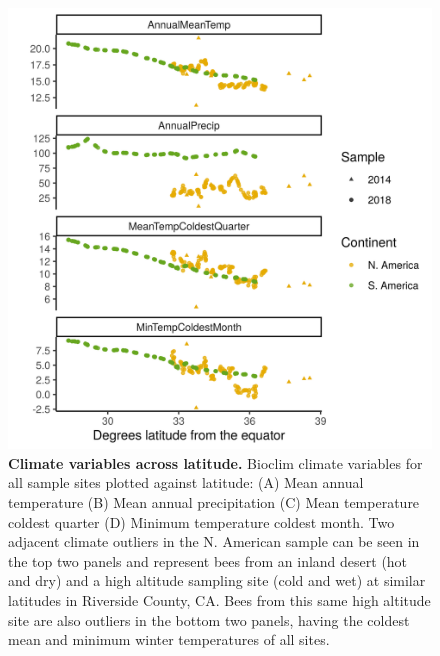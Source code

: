 \begin{figure}[ht]
\includegraphics[width=.9\textwidth]{chapter1/figures/climate_variables_across_latitude.png}
\caption{ \textbf{Climate variables across latitude.} Bioclim climate variables for all sample sites plotted against latitude: (A) Mean annual temperature (B) Mean annual precipitation (C) Mean temperature coldest quarter (D) Minimum temperature coldest month. Two adjacent climate outliers in the N. American sample can be seen in the top two panels and represent bees from an inland desert (hot and dry) and a high altitude sampling site (cold and wet) at similar latitudes in Riverside County, CA. Bees from this same high altitude site are also outliers in the bottom two panels, having the coldest mean and minimum winter temperatures of all sites.}

\label{supp_bioclim}
\end{figure}

